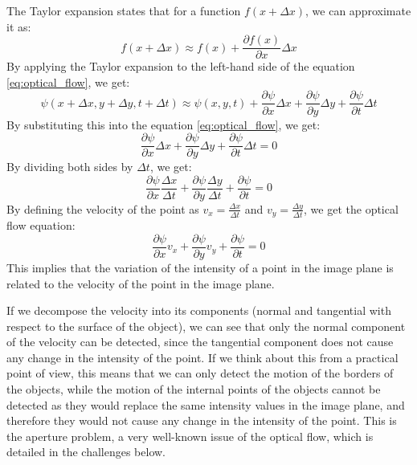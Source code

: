 The Taylor expansion states that for a function $f(x + \Delta x)$, we can approximate it as:
\begin{equation*}
    f(x + \Delta x) \approx f(x) + \frac{\partial f(x)}{\partial x} \Delta x
\end{equation*}
By applying the Taylor expansion to the left-hand side of the equation \ref{eq:optical_flow}, we get:
\begin{equation*}
    \psi(x + \Delta x, y + \Delta y, t + \Delta t) \approx \psi(x, y, t) + \frac{\partial \psi}{\partial x} \Delta x + \frac{\partial \psi}{\partial y} \Delta y + \frac{\partial \psi}{\partial t} \Delta t
\end{equation*}
By substituting this into the equation \ref{eq:optical_flow}, we get:
\begin{equation*}
    \frac{\partial \psi}{\partial x} \Delta x + \frac{\partial \psi}{\partial y} \Delta y + \frac{\partial \psi}{\partial t} \Delta t = 0
\end{equation*}
By dividing both sides by $\Delta t$, we get:
\begin{equation*}
    \frac{\partial \psi}{\partial x} \frac{\Delta x}{\Delta t} + \frac{\partial \psi}{\partial y} \frac{\Delta y}{\Delta t} + \frac{\partial \psi}{\partial t} = 0
\end{equation*}
By defining the velocity of the point as $v_x = \frac{\Delta x}{\Delta t}$ and $v_y = \frac{\Delta y}{\Delta t}$, we get the optical flow equation:
\begin{equation}
    \frac{\partial \psi}{\partial x} v_x + \frac{\partial \psi}{\partial y} v_y + \frac{\partial \psi}{\partial t} = 0
\end{equation}
This implies that the variation of the intensity of a point in the image plane is related to the velocity of the point in the image plane. 

If we decompose the velocity into its components (normal and tangential with respect to the surface of the object),
we can see that only the normal component of the velocity can be detected, since the tangential component does not cause any change in the intensity of the point.
If we think about this from a practical point of view, this means that we can only detect the motion of the borders of the objects, while the motion of the internal points 
of the objects cannot be detected as they would replace the same intensity values in the image plane, and therefore they would not cause any change in the intensity of the point.
This is the aperture problem, a very well-known issue of the optical flow, which is detailed in the challenges below.

